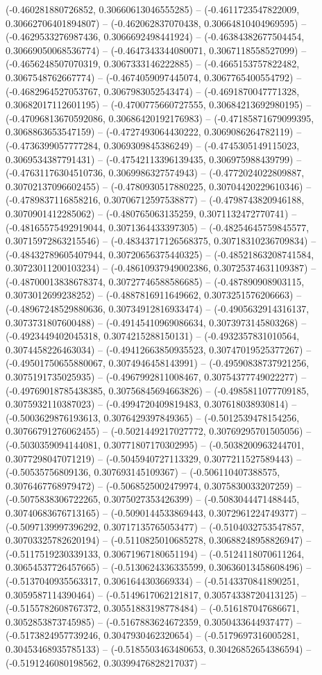 (-0.460281880726852, 0.30660613046555285) -- (-0.4611723547822009, 0.30662706401894807) -- (-0.462062837070438, 0.30664810404969595) -- (-0.4629533276987436, 0.3066692498441924) -- (-0.46384382677504454, 0.30669050068536774) -- (-0.4647343344080071, 0.3067118558527099) -- (-0.4656248507070319, 0.3067333146222885) -- (-0.4665153757822482, 0.3067548762667774) -- (-0.4674059097445074, 0.3067765400554792) -- (-0.4682964527053767, 0.3067983052543474) -- (-0.4691870047771328, 0.30682017112601195) -- (-0.4700775660727555, 0.30684213692980195) -- (-0.47096813670592086, 0.30686420192176983) -- (-0.47185871679099395, 0.3068863653547159) -- (-0.4727493064430222, 0.3069086264782119) -- (-0.4736399057777284, 0.3069309845386249) -- (-0.4745305149115023, 0.3069534387791431) -- (-0.47542113396139435, 0.306975988439799) -- (-0.47631176304510736, 0.3069986327574943) -- (-0.4772024022809887, 0.30702137096602455) -- (-0.4780930517880225, 0.30704420229610346) -- (-0.4789837116858216, 0.30706712597538877) -- (-0.4798743820946188, 0.3070901412285062) -- (-0.480765063135259, 0.3071132472770741) -- (-0.48165575492919044, 0.3071364433397305) -- (-0.48254645759845577, 0.30715972863215546) -- (-0.48343717126568375, 0.30718310236709834) -- (-0.48432789605407944, 0.30720656375440325) -- (-0.48521863208741584, 0.30723011200103234) -- (-0.48610937949002386, 0.30725374631109387) -- (-0.48700013838678374, 0.30727746588586685) -- (-0.487890908903115, 0.3073012699238252) -- (-0.4887816911649662, 0.3073251576206663) -- (-0.48967248529880636, 0.30734912816933474) -- (-0.4905632914316137, 0.3073731807600488) -- (-0.49145410969086634, 0.3073973145803268) -- (-0.4923449402045318, 0.3074215288150131) -- (-0.4932357831010564, 0.3074458226463034) -- (-0.49412663850935523, 0.30747019525377267) -- (-0.49501750655880067, 0.3074946458143991) -- (-0.49590838737921256, 0.3075191735025935) -- (-0.4967992811008467, 0.30754377749022277) -- (-0.49769018785438385, 0.30756845694663826) -- (-0.4985811077709185, 0.3075932110387023) -- (-0.4994720409819483, 0.307618038930814) -- (-0.5003629876193613, 0.3076429397849365) -- (-0.5012539478154256, 0.30766791276062455) -- (-0.5021449217027772, 0.30769295701505056) -- (-0.5030359094144081, 0.30771807170302995) -- (-0.5038200963244701, 0.3077298047071219) -- (-0.5045940727113329, 0.3077211527589443) -- (-0.50535756809136, 0.307693145109367) -- (-0.506110407388575, 0.3076467768979472) -- (-0.5068525002479974, 0.3075830033207259) -- (-0.5075838306722265, 0.3075027353426399) -- (-0.5083044471488445, 0.30740683676713165) -- (-0.5090144533869443, 0.3072961224749377) -- (-0.5097139997396292, 0.30717135765053477) -- (-0.5104032753547857, 0.30703325782620194) -- (-0.5110825010685278, 0.30688248958826947) -- (-0.5117519230339133, 0.30671967180651194) -- (-0.5124118070611264, 0.30654537726457665) -- (-0.5130624336335599, 0.30636013458608496) -- (-0.5137040935563317, 0.3061644303669334) -- (-0.5143370841890251, 0.3059587114390464) -- (-0.5149617062121817, 0.30574338720413125) -- (-0.5155782608767372, 0.30551883198778484) -- (-0.516187047686671, 0.3052853873745985) -- (-0.5167883624672359, 0.3050433644937477) -- (-0.5173824957739246, 0.3047930462320654) -- (-0.5179697316005281, 0.30453468935785133) -- (-0.5185503463480653, 0.30426852654386594) -- (-0.5191246080198562, 0.30399476828217037) -- 